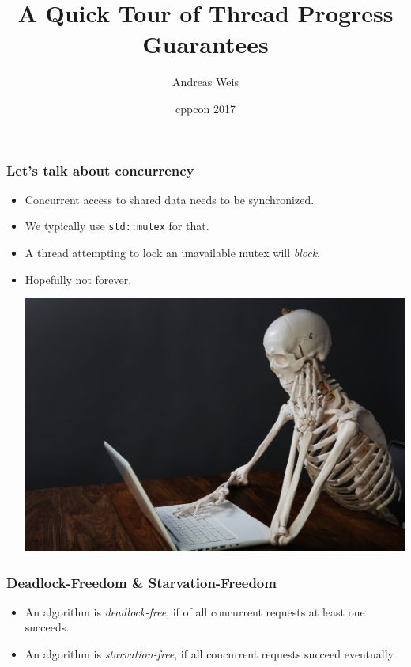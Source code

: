 \documentclass{beamer}
\title{A Quick Tour of Thread Progress Guarantees}
\author{Andreas Weis}
\institute{BMW AG}
\date{cppcon 2017}
\newif\iftransitions
\begin{document}
\frame{\titlepage}

\begin{frame}[fragile]
  \frametitle{Let's talk about concurrency}

  \begin{itemize}
\iftransitions \pause \fi
    \item Concurrent access to shared data needs to be synchronized.
\iftransitions \pause \fi
    \item We typically use \texttt{std::mutex} for that.
\iftransitions \pause \fi
    \item A thread attempting to lock an unavailable mutex will \emph{block}.
\iftransitions \pause \fi
    \item Hopefully not forever.
    \begin{center}
        \includegraphics[height=0.4\textheight]{resources/skeleton.jpg}
    \end{center}
  \end{itemize}
\end{frame}

\begin{frame}[fragile]
  \frametitle{Deadlock-Freedom \& Starvation-Freedom}

  \begin{itemize}

    \item An algorithm is \emph{deadlock-free}, if of all concurrent requests at least one succeeds.

    \iftransitions \pause \fi

    \item An algorithm is \emph{starvation-free}, if all concurrent requests succeed eventually.

  \end{itemize}
\end{frame}
\end{document}
